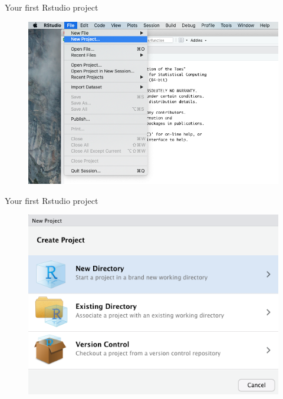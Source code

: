 \documentclass[ignorenonframetext,]{beamer}
\begin{document}
\begin{frame}{Your first Rstudio project}
\protect\hypertarget{your-first-rstudio-project}{}

\begin{figure}
\includegraphics[scale=0.35]{figures/new-project-1}
\end{figure}

\end{frame}

\begin{frame}{Your first Rstudio project}
\protect\hypertarget{your-first-rstudio-project-1}{}

\begin{figure}
\includegraphics[scale=0.43]{figures/new-project-2}
\end{figure}

\end{frame}
\end{document}
